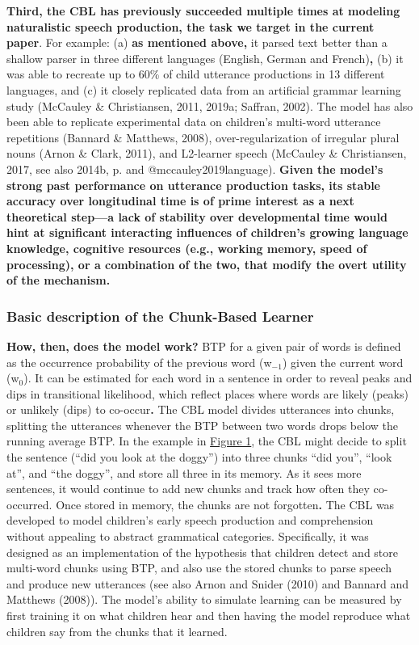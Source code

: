 \documentclass[
  english,
  man,mask,floatsintext]{apa6}
\begin{document}
\textbf{Third, the CBL has previously succeeded multiple times at modeling naturalistic speech production, the task we target in the current paper}. For example: (a) \textbf{as mentioned above,} it parsed text better than a shallow parser in three different languages (English, German and French)\textbf{,} (b) it was able to recreate up to 60\% of child utterance productions in 13 different languages, and (c) it closely replicated data from an artificial grammar learning study (McCauley \& Christiansen, 2011, 2019a; Saffran, 2002). The model has also been able to replicate experimental data on children's multi-word utterance repetitions (Bannard \& Matthews, 2008), over-regularization of irregular plural nouns (Arnon \& Clark, 2011), and L2-learner speech (McCauley \& Christiansen, 2017, see also 2014b, p. and @mccauley2019language). \textbf{Given the model's strong past performance on utterance production tasks, its stable accuracy over longitudinal time is of prime interest as a next theoretical step---a lack of stability over developmental time would hint at significant interacting influences of children's growing language knowledge, cognitive resources (e.g., working memory, speed of processing), or a combination of the two, that modify the overt utility of the mechanism.}

\hypertarget{basic-description-of-the-chunk-based-learner}{%
\subsubsection{\texorpdfstring{\textbf{Basic description of the Chunk-Based Learner}}{Basic description of the Chunk-Based Learner}}\label{basic-description-of-the-chunk-based-learner}}

\textbf{How, then, does the model work?} BTP for a given pair of words is defined as the occurrence probability of the previous word (w\(_{-1}\)) given the current word (w\(_0\)). It can be estimated for each word in a sentence in order to reveal peaks and dips in transitional likelihood, which reflect places where words are likely (peaks) or unlikely (dips) to co-occur\textbf{.} The CBL model divides utterances into chunks, splitting the utterances whenever the BTP between two words drops below the running average BTP. In the example in \protect\hyperlink{fig1}{Figure 1}, the CBL might decide to split the sentence (\enquote{did you look at the doggy}) into three chunks \enquote{did you}, \enquote{look at}, and \enquote{the doggy}, and store all three in its memory. As it sees more sentences, it would continue to add new chunks and track how often they co-occurred. Once stored in memory, the chunks are not forgotten\textbf{.} The CBL was developed to model children's early speech production and comprehension without appealing to abstract grammatical categories. Specifically, it was designed as an implementation of the hypothesis that children detect and store multi-word chunks using BTP, and also use the stored chunks to parse speech and produce new utterances (see also Arnon and Snider (2010) and Bannard and Matthews (2008)). The model's ability to simulate learning can be measured by first training it on what children hear and then having the model reproduce what children say from the chunks that it learned.
\end{document}
